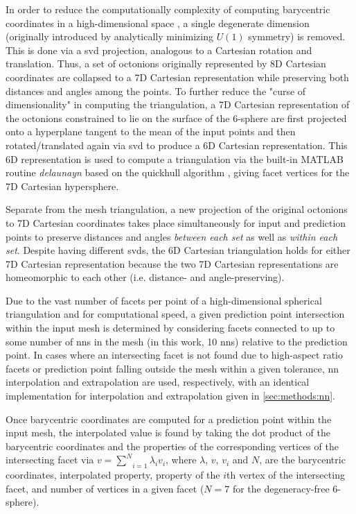\documentclass[preprint,12pt]{elsarticle}
\begin{document}
In order to reduce the computationally complexity of computing barycentric coordinates in a high-dimensional space \cite{barberQuickhullAlgorithmConvex1996}, a single degenerate dimension (originally introduced by analytically minimizing $U(1)$ symmetry) is removed. This is done via a \gls{svd} projection, analogous to a Cartesian rotation and translation. Thus, a set of octonions originally represented by 8D Cartesian coordinates are collapsed to a 7D Cartesian representation while preserving both distances and angles among the points. To further reduce the "curse of dimensionality" in computing the triangulation, a 7D Cartesian representation of the octonions constrained to lie on the surface of the 6-sphere are first projected onto a hyperplane tangent to the mean of the input points and then rotated/translated again via \gls{svd} to produce a 6D Cartesian representation. This 6D representation is used to compute a triangulation via the built-in MATLAB routine \textit{delaunayn} based on the quickhull algorithm \cite{barberQuickhullAlgorithmConvex1996}, giving facet vertices for the 7D Cartesian hypersphere.

Separate from the mesh triangulation, a new projection of the original octonions to 7D Cartesian coordinates takes place simultaneously for input and prediction points to preserve distances and angles \textit{between each set} as well as \textit{within each set}. Despite having different \glspl{svd}, the 6D Cartesian triangulation holds for either 7D Cartesian representation because the two 7D Cartesian representations are homeomorphic to each other (i.e. distance- and angle-preserving).

Due to the vast number of facets per point of a high-dimensional spherical triangulation and for computational speed, a given prediction point intersection within the input mesh is determined by considering facets connected to up to some number of \glspl{nn} in the mesh (in this work, 10 \glspl{nn}) relative to the prediction point. In cases where an intersecting facet is not found due to high-aspect ratio facets or prediction point falling outside the mesh within a given tolerance, \gls{nn} interpolation and extrapolation are used, respectively, with an identical implementation for interpolation and extrapolation given in \ref{sec:methods:nn}.

Once barycentric coordinates are computed for a prediction point within the input mesh, the interpolated value is found by taking the dot product of the barycentric coordinates and the properties of the corresponding vertices of the intersecting facet via $v=\underset{i=1}{\overset{N}{\sum }}\lambda _i v_i$, where $\lambda$, $v$, $v_i$ and $N$, are the barycentric coordinates, interpolated property, property of the $i$th vertex of the intersecting facet, and number of vertices in a given facet ($N = 7$ for the degeneracy-free 6-sphere).
    
\end{document}
